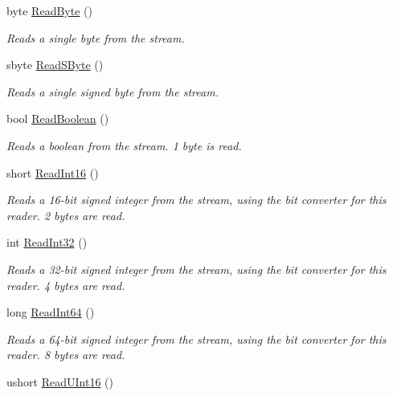 \begin{DoxyCompactItemize}
byte \mbox{\hyperlink{class_t_net_1_1_i_o_1_1_endian_binary_reader_ac68abe7686ebf47317658260a7e46c05}{Read\+Byte}} ()
\begin{DoxyCompactList}\small\item\em Reads a single byte from the stream. \end{DoxyCompactList}\item 
sbyte \mbox{\hyperlink{class_t_net_1_1_i_o_1_1_endian_binary_reader_a1160226e25216f979b76fe7f1990991e}{Read\+S\+Byte}} ()
\begin{DoxyCompactList}\small\item\em Reads a single signed byte from the stream. \end{DoxyCompactList}\item 
bool \mbox{\hyperlink{class_t_net_1_1_i_o_1_1_endian_binary_reader_a23eba8362b660682eb20797b04e3bf3f}{Read\+Boolean}} ()
\begin{DoxyCompactList}\small\item\em Reads a boolean from the stream. 1 byte is read. \end{DoxyCompactList}\item 
short \mbox{\hyperlink{class_t_net_1_1_i_o_1_1_endian_binary_reader_a6e160055b65116bd439d27956ee13569}{Read\+Int16}} ()
\begin{DoxyCompactList}\small\item\em Reads a 16-\/bit signed integer from the stream, using the bit converter for this reader. 2 bytes are read. \end{DoxyCompactList}\item 
int \mbox{\hyperlink{class_t_net_1_1_i_o_1_1_endian_binary_reader_adcc78fb1a9961b47818c2a9d4c9f71bd}{Read\+Int32}} ()
\begin{DoxyCompactList}\small\item\em Reads a 32-\/bit signed integer from the stream, using the bit converter for this reader. 4 bytes are read. \end{DoxyCompactList}\item 
long \mbox{\hyperlink{class_t_net_1_1_i_o_1_1_endian_binary_reader_aa8f5880eef1ba052963a1728f4f263fd}{Read\+Int64}} ()
\begin{DoxyCompactList}\small\item\em Reads a 64-\/bit signed integer from the stream, using the bit converter for this reader. 8 bytes are read. \end{DoxyCompactList}\item 
ushort \mbox{\hyperlink{class_t_net_1_1_i_o_1_1_endian_binary_reader_a7c106faa6d6df6a658ed98c50b529b7b}{Read\+U\+Int16}} ()

\end{DoxyCompactItemize}
